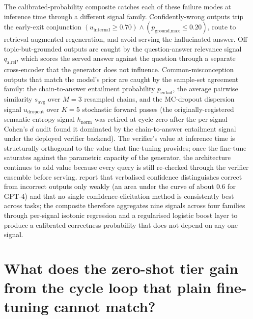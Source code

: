 The calibrated-probability composite catches each of these failure modes at inference time through a different signal family. Confidently-wrong outputs trip the early-exit conjunction $(u_{\text{internal}} \ge 0.70) \wedge\allowbreak (p_{\text{ground,max}} \le 0.20)$, route to retrieval-augmented regeneration, and avoid serving the hallucinated answer. Off-topic-but-grounded outputs are caught by the question-answer relevance signal $q_{\text{a,rel}}$, which scores the served answer against the question through a separate cross-encoder that the generator does not influence. Common-misconception outputs that match the model's prior are caught by the sample-set agreement family: the chain-to-answer entailment probability $p_{\text{entail}}$, the average pairwise similarity $s_{\text{avg}}$ over $M=3$ resampled chains, and the MC-dropout dispersion signal $u_{\text{dropout}}$ over $K=5$ stochastic forward passes (the originally-registered semantic-entropy signal $h_{\text{norm}}$ was retired at cycle zero after the per-signal Cohen's $d$ audit found it dominated by the chain-to-answer entailment signal under the deployed verifier backend). The verifier's value at inference time is structurally orthogonal to the value that fine-tuning provides; once the fine-tune saturates against the parametric capacity of the generator, the architecture continues to add value because every query is still re-checked through the verifier ensemble before serving. \cite{xiong2023can} report that verbalised confidence distinguishes correct from incorrect outputs only weakly (an area under the curve of about $0.6$ for GPT-4) and that no single confidence-elicitation method is consistently best across tasks; the composite therefore aggregates nine signals across four families through per-signal isotonic regression and a regularised logistic boost layer to produce a calibrated correctness probability that does not depend on any one signal.


\section[Tier-2 distillation]{What does the zero-shot tier gain from the cycle loop that plain fine-tuning cannot match?}
\label{app:qa-tier2-distillation}

